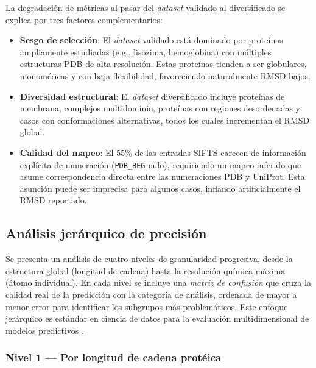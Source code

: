 La degradaci\'on de m\'etricas al pasar del \textit{dataset} validado al diversificado se explica
por tres factores complementarios:
\begin{itemize}
    \item \textbf{Sesgo de selecci\'on}: El \textit{dataset} validado est\'a dominado por prote\'inas
    ampliamente estudiadas (e.g., lisozima, hemoglobina) con m\'ultiples estructuras PDB de
    alta resoluci\'on. Estas prote\'inas tienden a ser globulares, monoméricas y con baja
    flexibilidad, favoreciendo naturalmente RMSD bajos.

    \item \textbf{Diversidad estructural}: El \textit{dataset} diversificado incluye prote\'inas
    de membrana, complejos multidom\'inio, prote\'inas con regiones desordenadas y casos
    con conformaciones alternativas, todos los cuales incrementan el RMSD global.

    \item \textbf{Calidad del mapeo}: El 55\% de las entradas SIFTS carecen de
    informaci\'on expl\'icita de numeraci\'on (\texttt{PDB\_BEG} nulo), requiriendo
    un mapeo inferido que asume correspondencia directa entre las numeraciones PDB y UniProt.
    Esta asunci\'on puede ser imprecisa para algunos casos, inflando artificialmente el
    RMSD reportado.
\end{itemize}

\subsection{An\'alisis jer\'arquico de precisi\'on}
\label{subsec:analisis_jerarquico_resultados}

Se presenta un an\'alisis de cuatro niveles de granularidad progresiva, desde la
estructura global (longitud de cadena) hasta la resoluci\'on qu\'imica m\'axima
(\'atomo individual). En cada nivel se incluye una \emph{matriz de confusi\'on}
que cruza la calidad real de la predicci\'on con la categor\'ia de an\'alisis,
ordenada de mayor a menor error para identificar los subgrupos m\'as problem\'aticos.
Este enfoque jer\'arquico es est\'andar en ciencia de datos para la evaluaci\'on
multidimensional de modelos predictivos \citep{Fawcett2006}.

\subsubsection{Nivel 1 --- Por longitud de cadena prot\'eica}
\label{subsubsec:longitud}


